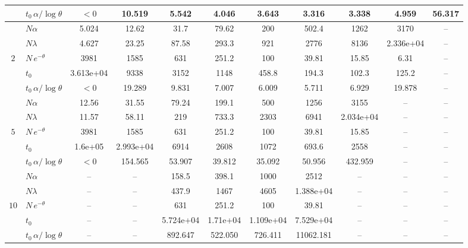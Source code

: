 \documentclass[10pt]{article}
\begin{document}
\begin{table}[t]
\begin{adjustbox}{max width=\textwidth, max totalheight=0.9\textheight, center}
\begin{tabular}{c lccccccccc}
 & $t_0\,\alpha/\log\theta$ & $<0$ & 10.519 & 5.542 & 4.046 & 3.643 & 3.316 & 3.338 & 4.959 & 56.317 \\
\midrule
 & $N\alpha$ & 5.024 & 12.62 & 31.7 & 79.62 & 200 & 502.4 & 1262 & 3170 & -- \\
 & $N\lambda$ & 4.627 & 23.25 & 87.58 & 293.3 & 921 & 2776 & 8136 & 2.336e+04 & -- \\
$2$ & $N\,e^{-\theta}$ & 3981 & 1585 & 631 & 251.2 & 100 & 39.81 & 15.85 & 6.31 & -- \\
 & $t_0$ & 3.613e+04 & 9338 & 3152 & 1148 & 458.8 & 194.3 & 102.3 & 125.2 & -- \\
 & $t_0\,\alpha/\log\theta$ & $<0$ & 19.289 & 9.831 & 7.007 & 6.009 & 5.711 & 6.929 & 19.878 & -- \\
\midrule
 & $N\alpha$ & 12.56 & 31.55 & 79.24 & 199.1 & 500 & 1256 & 3155 & -- & -- \\
 & $N\lambda$ & 11.57 & 58.11 & 219 & 733.3 & 2303 & 6941 & 2.034e+04 & -- & -- \\
$5$ & $N\,e^{-\theta}$ & 3981 & 1585 & 631 & 251.2 & 100 & 39.81 & 15.85 & -- & -- \\
 & $t_0$ & 1.6e+05 & 2.993e+04 & 6914 & 2608 & 1072 & 693.6 & 2558 & -- & -- \\
 & $t_0\,\alpha/\log\theta$ & $<0$ & 154.565 & 53.907 & 39.812 & 35.092 & 50.956 & 432.959 & -- & -- \\
\midrule
 & $N\alpha$ & -- & -- & 158.5 & 398.1 & 1000 & 2512 & -- & -- & -- \\
 & $N\lambda$ & -- & -- & 437.9 & 1467 & 4605 & 1.388e+04 & -- & -- & -- \\
$10$ & $N\,e^{-\theta}$ & -- & -- & 631 & 251.2 & 100 & 39.81 & -- & -- & -- \\
 & $t_0$ & -- & -- & 5.724e+04 & 1.71e+04 & 1.109e+04 & 7.529e+04 & -- & -- & -- \\
 & $t_0\,\alpha/\log\theta$ & -- & -- & 892.647 & 522.050 & 726.411 & 11062.181 & -- & -- & -- \\
\bottomrule
\end{tabular}
\end{adjustbox}
\end{table}
\end{document}
